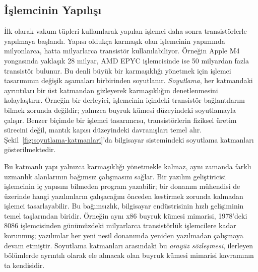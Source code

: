 \subsection{İşlemcinin Yapılışı}
\label{sec:islemcinin-yapilisi}
İlk olarak vakum tüpleri kullanılarak yapılan işlemci daha sonra transistörlerle yapılmaya başlandı. Yapısı oldukça karmaşık olan işlemcinin yapımında milyonlarca, hatta milyarlarca transistör kullanılabiliyor. Örneğin Apple M4 yongasında yaklaşık 28 milyar, AMD EPYC işlemcisinde ise 50 milyardan fazla transistör bulunur. Bu denli büyük bir karmaşıklığı yönetmek için işlemci tasarımının değişik aşamaları birbirinden soyutlanır. \emph{Soyutlama}, her katmandaki ayrıntıları bir üst katmandan gizleyerek karmaşıklığın denetlenmesini kolaylaştırır. Örneğin bir derleyici, işlemcinin içindeki transistör bağlantılarını bilmek zorunda değildir; yalnızca buyruk kümesi düzeyindeki soyutlamayla çalışır. Benzer biçimde bir işlemci tasarımcısı, transistörlerin fiziksel üretim sürecini değil, mantık kapısı düzeyindeki davranışları temel alır. Şekil~\ref{fig:soyutlama-katmanlari}'da bilgisayar sistemindeki soyutlama katmanları gösterilmektedir.

Bu katmanlı yapı yalnızca karmaşıklığı yönetmekle kalmaz, aynı zamanda farklı uzmanlık alanlarının bağımsız çalışmasını sağlar. Bir yazılım geliştiricisi işlemcinin iç yapısını bilmeden program yazabilir; bir donanım mühendisi de üzerinde hangi yazılımların çalışacağını önceden kestirmek zorunda kalmadan işlemci tasarlayabilir. Bu bağımsızlık, bilgisayar endüstrisinin hızlı gelişiminin temel taşlarından biridir. Örneğin aynı x86 buyruk kümesi mimarisi, 1978'deki 8086 işlemcisinden günümüzdeki milyarlarca transistörlük işlemcilere kadar korunmuş; yazılımlar her yeni nesil donanımda yeniden yazılmadan çalışmaya devam etmiştir. Soyutlama katmanları arasındaki bu \emph{arayüz sözleşmesi}, ilerleyen bölümlerde ayrıntılı olarak ele alınacak olan buyruk kümesi mimarisi kavramının ta kendisidir.

